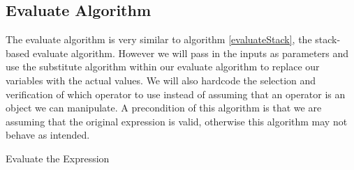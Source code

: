 \documentclass[../../../../../main.tex]{subfiles}
\begin{document}
\subsection{Evaluate Algorithm}	
The evaluate algorithm is very similar to algorithm \ref{evaluateStack}, the stack-based evaluate algorithm. However we will pass in the inputs as parameters and use the substitute algorithm within our evaluate algorithm to replace our variables with the actual values. We will also hardcode the selection and verification of which operator to use instead of assuming that an operator is an object we can manipulate. A precondition of this algorithm is that we are assuming that the original expression is valid, otherwise this algorithm may not behave as intended.

\begin{algorithm}[H]
\DontPrintSemicolon
\caption{Evaluate the Expression}
\end{algorithm}
\newpage
\end{document}
